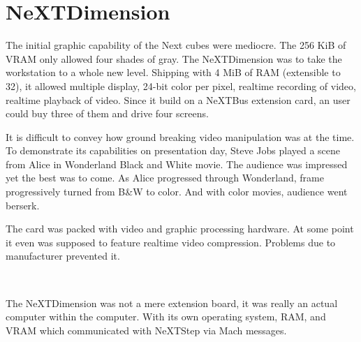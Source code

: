 \section{NeXTDimension}
The initial graphic capability of the Next cubes were mediocre. The 256 KiB of VRAM only allowed four shades of gray. The NeXTDimension was to take the workstation to a whole new level. Shipping with 4 MiB of RAM (extensible to 32), it allowed multiple display, 24-bit color per pixel, realtime recording of video, realtime playback of video. Since it build on a NeXTBus extension card, an user could buy three of them and drive four screens.\\
\par
It is difficult to convey how ground breaking video manipulation was at the time. To demonstrate its capabilities on presentation day, Steve Jobs played a scene from Alice in Wonderland Black and White movie. The audience was impressed yet the best was to come. As Alice progressed through Wonderland, frame progressively turned from B\&W to color. And with color movies, audience went berserk.\\
\par
The card was packed with video and graphic processing hardware. At some point it even was supposed to feature realtime video compression. Problems due to manufacturer prevented it.\\
\par
{}\\
\par
The NeXTDimension was not a mere extension board, it was really an actual computer within the computer. With its own operating system, RAM, and VRAM which communicated with NeXTStep via Mach messages.\\
\par
{}
